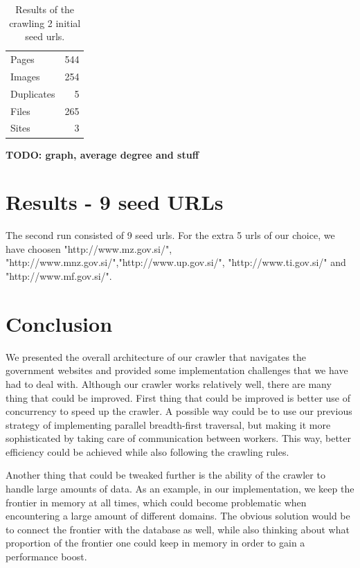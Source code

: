 \documentclass[9pt]{IEEEtran}
\begin{document}
\begin{table}[H]
    \begin{center}
    \caption{Results of the crawling 2 initial seed urls.}
        \begin{tabular}{ l | r }
        Pages & 544 \\
        Images & 254 \\
        Duplicates & 5 \\
        Files & 265 \\
        Sites & 3
        \end{tabular}
    \label{tab:results2}
    \end{center}
\end{table}


\textbf{TODO: graph, average degree and stuff}
\section{Results - 9 seed URLs}
The second run consisted of 9 seed urls. For the extra 5 urls of our choice, we have choosen "http://www.mz.gov.si/", "http://www.mnz.gov.si/","http://www.up.gov.si/", "http://www.ti.gov.si/" and "http://www.mf.gov.si/". 

\section{Conclusion}
We presented the overall architecture of our crawler that navigates the government websites and provided some implementation challenges that we have had to deal with.
Although our crawler works relatively well, there are many thing that could be improved.
First thing that could be improved is better use of concurrency to speed up the crawler.
A possible way could be to use our previous strategy of implementing parallel breadth-first traversal, but making it more sophisticated by taking care of communication between workers.
This way, better efficiency could be achieved while also following the crawling rules.

Another thing that could be tweaked further is the ability of the crawler to handle large amounts of data.
As an example, in our implementation, we keep the frontier in memory at all times, which could become problematic when encountering a large amount of different domains.
The obvious solution would be to connect the frontier with the database as well, while also thinking about what proportion of the frontier one could keep in memory in order to gain a performance boost.
\end{document}
